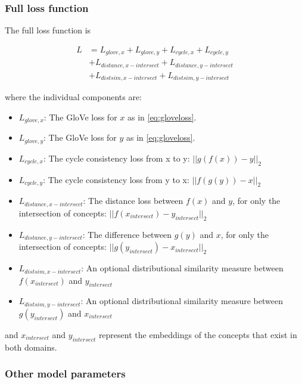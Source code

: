 \subsubsection{Full loss function}

The full loss function is

\begin{equation}
\label{eq:fulllossfunction}
\begin{split}
L & = L_{glove, x} + L_{glove, y} + L_{cycle, x} + L_{cycle, y} \\
  & + L_{distance, x-intersect} + L_{distance, y-intersect} \\
  & + L_{distsim, x-intersect} + L_{distsim, y-intersect}
\end{split}
\end{equation}

where the individual components are: 

\begin{itemize}
    \item $L_{glove, x}$: The GloVe loss for $x$ as in \ref{eq:gloveloss}. 
    \item $L_{glove, y}$: The GloVe loss for $y$ as in \ref{eq:gloveloss}. 
    \item $L_{cycle, x}$: The cycle consistency loss from x to y: $||g(f(x)) - y||_2$
    \item $L_{cycle, y}$: The cycle consistency loss from y to x: $||f(g(y)) - x||_2$
    \item $L_{distance, x-intersect}$: The distance loss between $f(x)$ and $y$, for only the intersection of concepts: $||f(x_{intersect}) - y_{intersect}||_2$
    \item $L_{distance, y-intersect}$: The difference between $g(y)$ and $x$, for only the intersection of concepts: $||g(y_{intersect}) - x_{intersect}||_2$
    \item $L_{distsim, x-intersect}$: An optional distributional similarity measure between $f(x_{intersect})$ and $y_{intersect}$
    \item $L_{distsim, y-intersect}$: An optional distributional similarity measure between $g(y_{intersect})$ and $x_{intersect}$
\end{itemize}

and $x_{intersect}$ and $y_{intersect}$ represent the embeddings of the concepts that exist in both domains. 

\subsubsection{Other model parameters}

